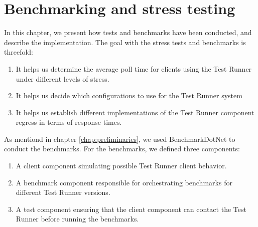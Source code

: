 \section{Benchmarking and stress testing} \label{chap:Benchmarking}
In this chapter, we present how tests and benchmarks have been conducted, and describe the implementation.
The goal with the stress tests and benchmarks is threefold:
\begin{enumerate}
\item It helps us determine the average poll time for clients using the Test Runner under different levels of stress.
\item It helps us decide which configurations to use for the Test Runner system
\item It helps us establish different implementations of the Test Runner component regress in terms of response times.
\end{enumerate}
As mentiond in chapter \ref{chap:preliminaries}, we used BenchmarkDotNet to conduct the benchmarks.
For the benchmarks, we defined three components:
\begin{enumerate}
  \item A client component simulating possible Test Runner client behavior.
  \item A benchmark component responsible for orchestrating benchmarks for different Test Runner versions.
  \item A test component ensuring that the client component can contact the Test Runner before running the benchmarks.
\end{enumerate}


